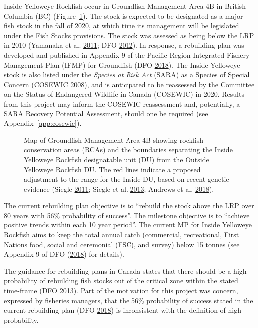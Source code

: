 \documentclass[11pt]{book}
\begin{document}
Inside Yelloweye Rockfish occur in Groundfish Management Area 4B in British Columbia (BC) (Figure~\ref{fig:map-4B}). The stock is expected to be designated as a major fish stock in the fall of 2020, at which time its management will be legislated under the Fish Stocks provisions. The stock was assessed as being below the LRP in 2010 (Yamanaka et al. \protect\hyperlink{ref-yamanaka2011}{2011}; DFO \protect\hyperlink{ref-dfo2012}{2012}). In response, a rebuilding plan was developed and published in Appendix 9 of the Pacific Region Integrated Fishery Management Plan (IFMP) for Groundfish (DFO \protect\hyperlink{ref-ifmp2018}{2018}). The Inside Yelloweye stock is also listed under the \emph{Species at Risk Act} (SARA) as a Species of Special Concern (COSEWIC \protect\hyperlink{ref-cosewic2008}{2008}), and is anticipated to be reassessed by the Committee on the Status of Endangered Wildlife in Canada (COSEWIC) in 2020. Results from this project may inform the COSEWIC reassessment and, potentially, a SARA Recovery Potential Assessment, should one be required (see Appendix~\ref{app:cosewic}).


\begin{figure}[htb]

{\centering {} 

}

\caption{Map of Groundfish Management Area 4B showing rockfish conservation areas (RCAs) and the boundaries separating the Inside Yelloweye Rockfish designatable unit (DU) from the Outside Yelloweye Rockfish DU. The red lines indicate a proposed adjustment to the range for the Inside DU, based on recent genetic evidence (Siegle \protect\hyperlink{ref-siegle2011}{2011}; Siegle et al. \protect\hyperlink{ref-siegle2013}{2013}; Andrews et al. \protect\hyperlink{ref-andrews2018}{2018}).}\label{fig:map-4B}
\end{figure}
The current rebuilding plan objective is to ``rebuild the stock above the LRP over 80 years with 56\% probability of success''. The milestone objective is to ``achieve positive trends within each 10 year period''. The current MP for Inside Yelloweye Rockfish aims to keep the total annual catch (commercial, recreational, First Nations food, social and ceremonial (FSC), and survey) below 15 tonnes (see Appendix 9 of DFO (\protect\hyperlink{ref-ifmp2018}{2018}) for details).

The guidance for rebuilding plans in Canada states that there should be a high probability of rebuilding fish stocks out of the critical zone within the stated time-frame (DFO \protect\hyperlink{ref-dfo2013}{2013}). Part of the motivation for this project was concern, expressed by fisheries managers, that the 56\% probability of success stated in the current rebuilding plan (DFO \protect\hyperlink{ref-ifmp2018}{2018}) is inconsistent with the definition of high probability.
\end{document}
